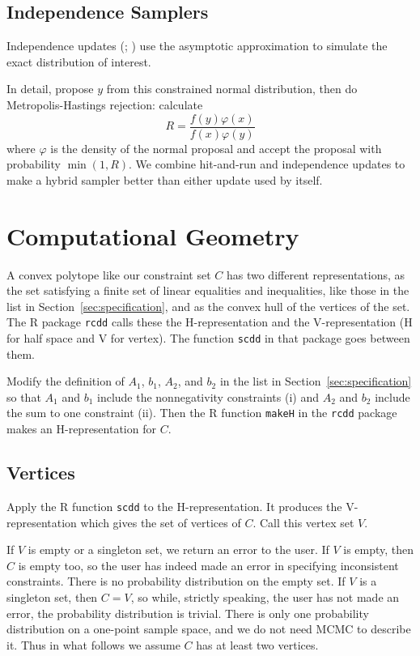 \documentclass[11pt]{article}
\begin{document}
\subsection{Independence Samplers}

Independence updates (\citealp{hastings};
\citealp[Section~2.3.3]{tierney}) use the asymptotic approximation
to simulate the exact distribution of interest.

In detail, propose $y$ from this constrained normal distribution,
then do Metropolis-Hastings rejection: calculate
$$
    R = \frac{f(y) \varphi(x)}{f(x) \varphi(y)}
$$
where $\varphi$ is the density of the normal proposal and accept the
proposal with probability $\min(1, R)$.
We combine hit-and-run and independence updates to make a hybrid sampler
\citep[Section~2.4]{tierney} better than either update used by itself.

\section{Computational Geometry} \label{sec:computational-geometry}

A convex polytope like our constraint set $C$ has two different
representations, as the set satisfying a finite set of linear equalities
and inequalities, like those in the list in Section~\ref{sec:specification},
and as the convex hull
of the vertices of the set.   The R package \texttt{rcdd} calls these
the H-representation and the V-representation
(H for half space and V for vertex).  The function
\texttt{scdd} in that package goes between them.

Modify the definition of $A_1$, $b_1$, $A_2$, and $b_2$ in the list in
Section~\ref{sec:specification}
so that $A_1$ and $b_1$ include the nonnegativity constraints (i) and
$A_2$ and $b_2$ include the sum to one constraint (ii).  Then the
R function \texttt{makeH} in the \texttt{rcdd} package makes
an H-representation for $C$.

\subsection{Vertices}

Apply the R function \texttt{scdd} to the H-representation.
It produces the V-representation which gives the set of vertices of $C$.
Call this vertex set $V$.

If $V$ is empty or a singleton set, we return an error to the user.
If $V$ is empty, then $C$ is empty too, so the user has indeed made an
error in specifying inconsistent constraints.  There is no probability
distribution on the empty set.
If $V$ is a singleton set, then $C = V$, so while, strictly speaking,
the user has not made an error, the probability distribution is trivial.
There is only one probability distribution on a one-point sample space,
and we do not need MCMC to describe it.
Thus in what follows we assume $C$ has at least two vertices.
\end{document}
